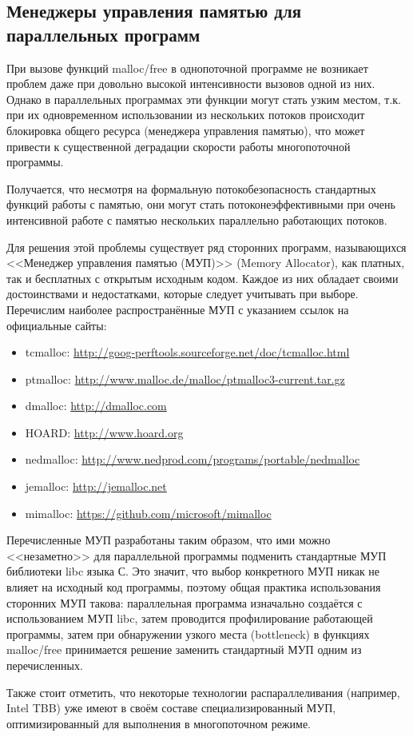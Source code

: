 \subsection{Менеджеры управления памятью для параллельных программ}

При вызове функций malloc/free в однопоточной программе не возникает проблем даже при довольно высокой интенсивности вызовов одной из них. Однако в параллельных программах эти функции могут стать узким местом, т.к. при их одновременном использовании из нескольких потоков происходит блокировка общего ресурса (менеджера управления памятью), что может привести к существенной деградации скорости работы многопоточной программы.

Получается, что несмотря на формальную потокобезопасность стандартных функций работы с памятью, они могут стать потоконеэффективными при очень интенсивной работе с памятью нескольких параллельно работающих потоков.

Для решения этой проблемы существует ряд сторонних программ, называющихся <<Менеджер управления памятью (МУП)>> (Memory Al\-lo\-ca\-tor), как платных, так и бесплатных с открытым исходным кодом. Каждое из них обладает своими достоинствами и недостатками, которые следует учитывать при выборе. Перечислим наиболее распространённые МУП с указанием ссылок на официальные сайты:

\begin{itemize}
    \item tcmalloc: \url{http://goog-perftools.sourceforge.net/doc/tcmalloc.html}
    \item ptmalloc: \url{http://www.malloc.de/malloc/ptmalloc3-current.tar.gz}
    \item dmalloc: \url{http://dmalloc.com}
    \item HOARD: \url{http://www.hoard.org}
    \item nedmalloc: \url{http://www.nedprod.com/programs/portable/nedmalloc}
    \item jemalloc: \url{http://jemalloc.net}
    \item mimalloc: \url{https://github.com/microsoft/mimalloc}
\end{itemize}

Перечисленные МУП разработаны таким образом, что ими можно <<незаметно>> для параллельной программы подменить стандартные МУП библиотеки libc языка С. Это значит, что выбор конкретного МУП никак не влияет на исходный код программы, поэтому общая практика использования сторонних МУП такова: параллельная программа изначально создаётся с использованием МУП libc, затем проводится профилирование работающей программы, затем при обнаружении узкого места (bottleneck) в функциях malloc/free принимается решение заменить стандартный МУП одним из перечисленных.

Также стоит отметить, что некоторые технологии распараллеливания (например, Intel TBB) уже имеют в своём составе специализированный МУП, оптимизированный для выполнения в многопоточном режиме.
